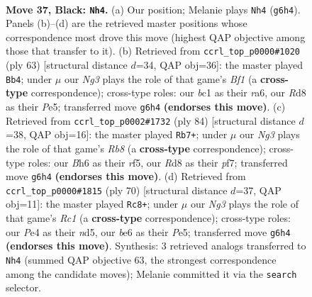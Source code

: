 \documentclass[11pt]{article}
\begin{document}
\clearpage

\begin{figure}[p]\centering
\begin{subfigure}{0.46\textwidth}\centering
\resizebox{\linewidth}{!}{%
\newchessgame
\chessboard[
  setfen={3r4/p6k/Pp2B1nb/5p2/4pP2/8/8/1RB1K3 b - - 7 37},
  showmover=false,
  pgfstyle=straightmove, color=movearrow, markmove={g6-h4}
]}
\caption{}
\end{subfigure}\hfill
\begin{subfigure}{0.46\textwidth}\centering
\resizebox{\linewidth}{!}{%
\newchessgame
\chessboard[
  setfen={5b2/5k1p/R5p1/4p3/P7/3KB1P1/r6P/8 b - - 1 32},
  showmover=false,
  pgfstyle=straightmove, color=movearrow, markmove={f8-b4}
]}
\caption{}
\end{subfigure}
\\[4pt]
\begin{subfigure}{0.46\textwidth}\centering
\resizebox{\linewidth}{!}{%
\newchessgame
\chessboard[
  setfen={1R6/3k1pp1/5b2/1p3r2/1P6/2P1B3/2K2P2/8 w - - 26 43},
  showmover=false,
  pgfstyle=straightmove, color=movearrow, markmove={b8-b7}
]}
\caption{}
\end{subfigure}\hfill
\begin{subfigure}{0.46\textwidth}\centering
\resizebox{\linewidth}{!}{%
\newchessgame
\chessboard[
  setfen={7k/p6p/3N2p1/3nP3/8/3B1KP1/br5P/2R5 w - - 2 36},
  showmover=false,
  pgfstyle=straightmove, color=movearrow, markmove={c1-c8}
]}
\caption{}
\end{subfigure}
\caption{\textbf{Move 37, Black: \texttt{Nh4}.} (a) Our position; Melanie plays \texttt{Nh4} (\texttt{g6h4}). Panels (b)--(d) are the retrieved master positions whose correspondence most drove this move (highest QAP objective among those that transfer to it). (b) Retrieved from \texttt{ccrl\_top\_p0000\#1020} (ply 63) [structural distance $d$=34, QAP obj=36]: the master played \texttt{Bb4}; under $\mu$ our \emph{Ng3} plays the role of that game's \emph{Bf1} (a \textbf{cross-type} correspondence); cross-type roles: our \emph{b}c1 as their \emph{r}a6, our \emph{R}d8 as their \emph{P}e5; transferred move \texttt{g6h4} \textbf{(endorses this move)}. (c) Retrieved from \texttt{ccrl\_top\_p0002\#1732} (ply 84) [structural distance $d$=38, QAP obj=16]: the master played \texttt{Rb7+}; under $\mu$ our \emph{Ng3} plays the role of that game's \emph{Rb8} (a \textbf{cross-type} correspondence); cross-type roles: our \emph{B}h6 as their \emph{r}f5, our \emph{R}d8 as their \emph{p}f7; transferred move \texttt{g6h4} \textbf{(endorses this move)}. (d) Retrieved from \texttt{ccrl\_top\_p0000\#1815} (ply 70) [structural distance $d$=37, QAP obj=11]: the master played \texttt{Rc8+}; under $\mu$ our \emph{Ng3} plays the role of that game's \emph{Rc1} (a \textbf{cross-type} correspondence); cross-type roles: our \emph{P}e4 as their \emph{n}d5, our \emph{b}e6 as their \emph{P}e5; transferred move \texttt{g6h4} \textbf{(endorses this move)}. Synthesis: 3 retrieved analogs transferred to \texttt{Nh4} (summed QAP objective 63, the strongest correspondence among the candidate moves); Melanie committed it via the \texttt{search} selector.}
\label{fig:thought-m73}
\end{figure}
\end{document}

